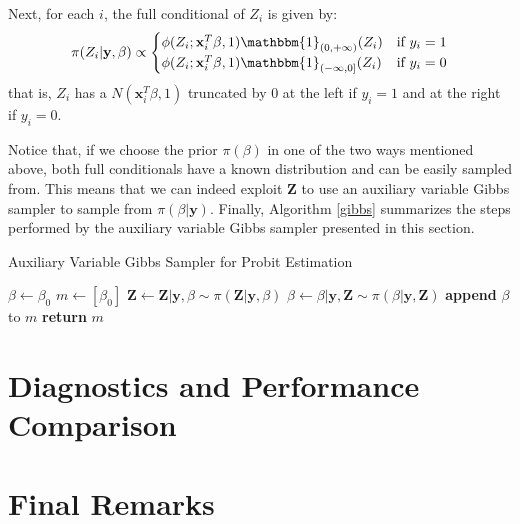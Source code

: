 \documentclass{article}
\newcommand{\IF}[2]{\mathbbm{1}_{#1}(#2)} %
\renewcommand{\vec}[1]{\mathbf{#1}}
\begin{document}
\par
Next, for each \(i\), the full conditional of \(Z_i\) is given by:
\begin{equation*}
    \pi(Z_i | \vec{y}, \beta) \propto 
    \begin{cases}
        \phi(Z_i; \vec{x}_i^T \beta, 1) \IF{(0, +\infty)}{Z_i} & \text{if } y_i = 1 \\
        \phi(Z_i; \vec{x}_i^T \beta, 1) \IF{(-\infty, 0]}{Z_i} & \text{if } y_i = 0
    \end{cases}
\end{equation*}
that is, \(Z_i\) has a \(N(\vec{x}_i^T \beta, 1)\) truncated by 0 at the left if \(y_i = 1\) and at the right if \(y_i = 0\).
\par 
Notice that, if we choose the prior \(\pi(\beta)\) in one of the two ways mentioned above, both full conditionals have a known distribution and can be easily sampled from. This means that we can indeed exploit \(\vec{Z}\) to use an auxiliary variable Gibbs sampler to sample from \(\pi(\beta|\vec{y})\). Finally, Algorithm \ref{gibbs} summarizes the steps performed by the auxiliary variable Gibbs sampler presented in this section.

\begin{algorithm}
\caption{Auxiliary Variable Gibbs Sampler for Probit Estimation}\label{gibbs}
\begin{algorithmic}[1]
    \State $\beta \gets \beta_0$
    \State $m \gets [\beta_0]$
    \Repeat
        \State $\vec{Z} \gets \vec{Z} | \vec{y}, \beta \sim \pi(\vec{Z}|\vec{y}, \beta)$
        \State $\beta \gets \beta | \vec{y}, \vec{Z} \sim \pi(\beta | \vec{y}, \vec{Z})$
        \State \textbf{append} $\beta$ to $m$
    \State \textbf{return} $m$
\EndProcedure
\end{algorithmic}
\end{algorithm}

\section{Diagnostics and Performance Comparison}
\section{Final Remarks}



\end{document}
